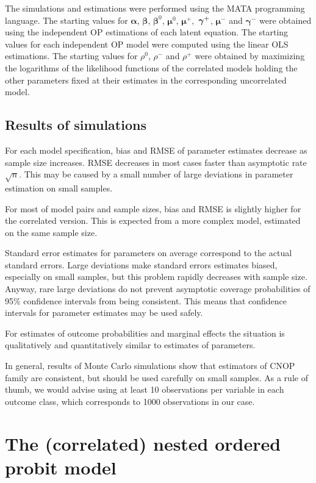 \documentclass[letterpaper,fleqn,11pt]{article}
\begin{document}
The simulations and estimations were performed using the MATA programming
language. The starting values for $\mathbf{\alpha }$, $\mathbf{\beta }$, $%
\mathbf{\beta }^{0}$, $\mathbf{\mu }^{0}$, $\mathbf{\mu }^{+},$ $\mathbf{%
\gamma }^{+}$, $\mathbf{\mu }^{-}$ and $\mathbf{\gamma }^{-}$ were obtained
using the independent OP estimations of each latent equation. The starting
values for each independent OP model were computed using the linear OLS
estimations. The starting values for $\rho ^{0}$, $\rho ^{-}$ and $\rho ^{+}$
were obtained by maximizing the logarithms of the likelihood functions of
the correlated models holding the other parameters fixed at their estimates
in the corresponding uncorrelated model.

\subsection*{Results of simulations}

For each model specification, bias and RMSE of parameter estimates decrease
as sample size increases. RMSE decreases in most cases faster than
asymptotic rate $\sqrt{n}$. This may be caused by a small number of large
deviations in parameter estimation on small samples.

For most of model pairs and sample sizes, bias and RMSE is slightly higher
for the correlated version. This is expected from a more complex model,
estimated on the same sample size.

Standard error estimates for parameters on average correspond to the actual
standard errors. Large deviations make standard errors estimates biased,
especially on small samples, but this problem rapidly decreases with sample
size. Anyway, rare large deviations do not prevent asymptotic coverage
probabilities of 95\% confidence intervals from being consistent. This means
that confidence intervals for parameter estimates may be used safely.

For estimates of outcome probabilities and marginal effects the situation is
qualitatively and quantitatively similar to estimates of parameters.

In general, results of Monte Carlo simulations show that estimators of CNOP
family are consistent, but should be used carefully on small samples. As a
rule of thumb, we would advise using at least 10 observations per variable
in each outcome class, which corresponds to 1000 observations in our case.

\section{\protect\Large The (correlated) nested ordered probit model}
\end{document}
